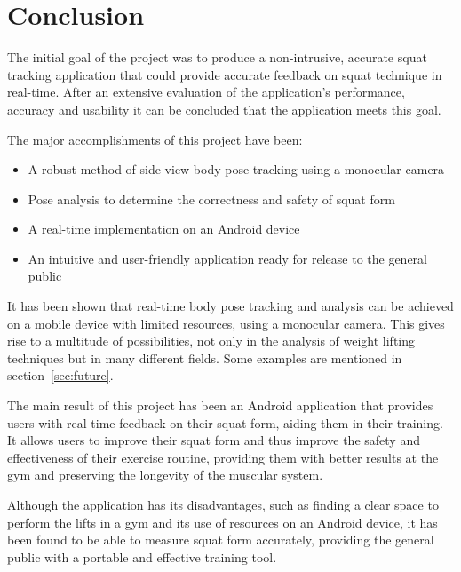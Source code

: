 \chapter{Conclusion}

The initial goal of the project was to produce a non-intrusive, accurate squat tracking application that could provide accurate feedback on squat technique in real-time. After an extensive evaluation of the application's performance, accuracy and usability it can be concluded that the application meets this goal.

The major accomplishments of this project have been:

\begin{itemize}
	\item A robust method of side-view body pose tracking using a monocular camera
	\item Pose analysis to determine the correctness and safety of squat form
	\item A real-time implementation on an Android device
	\item An intuitive and user-friendly application ready for release to the general public
\end{itemize}

It has been shown that real-time body pose tracking and analysis can be achieved on a mobile device with limited resources, using a monocular camera. This gives rise to a multitude of possibilities, not only in the analysis of weight lifting techniques but in many different fields. Some examples are mentioned in section~\ref{sec:future}.

The main result of this project has been an Android application that provides users with real-time feedback on their squat form, aiding them in their training. It allows users to improve their squat form and thus improve the safety and effectiveness of their exercise routine, providing them with better results at the gym and preserving the longevity of the muscular system.

Although the application has its disadvantages, such as finding a clear space to perform the lifts in a gym and its use of resources on an Android device, it has been found to be able to measure squat form accurately, providing the general public with a portable and effective training tool.